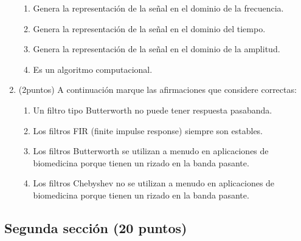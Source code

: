 \documentclass[12pt,a4paper]{article}
\providecommand{\tightlist}{%
  \setlength{\itemsep}{0pt}\setlength{\parskip}{0pt}}\usepackage{longtable,booktabs,array}
\providecommand{\tightlist}{%
  \setlength{\itemsep}{0pt}\setlength{\parskip}{2pt}}
\begin{document}
\begin{enumerate}
  \begin{enumerate}
  \tightlist
  \item
    Genera la representación de la señal en el dominio de la frecuencia.
  \item
    Genera la representación de la señal en el dominio del tiempo.
  \item
    Genera la representación de la señal en el dominio de la amplitud.
  \item
    Es un algoritmo computacional.
  \end{enumerate}
\item
  (2puntos) A continuación marque las afirmaciones que considere
  correctas:

  \begin{enumerate}
  \tightlist
  \item
    Un filtro tipo Butterworth no puede tener respuesta pasabanda.
  \item
    Los filtros FIR (finite impulse response) siempre son estables.
  \item
    Los filtros Butterworth se utilizan a menudo en aplicaciones de
    biomedicina porque tienen un rizado en la banda pasante.
  \item
    Los filtros Chebyshev no se utilizan a menudo en aplicaciones de
    biomedicina porque tienen un rizado en la banda pasante.
  \end{enumerate}
\end{enumerate}

\subsection{Segunda sección (20
puntos)}\label{segunda-secciuxf3n-20-puntos}
\end{document}
